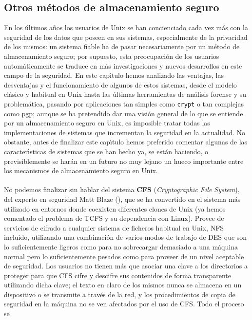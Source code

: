 \subsection{Otros m\'etodos de almacenamiento seguro}
En los \'ultimos a\~nos los usuarios de Unix se han concienciado cada vez m\'as
con la seguridad de los datos que poseen en sus sistemas, especialmente de la
privacidad de los mismos: un sistema fiable ha de pasar necesariamente por un 
m\'etodo de almacenamiento seguro; por supuesto, esta preocupaci\'on de los 
usuarios autom\'aticamente se traduce en m\'as investigaciones y nuevos 
desarrollos en este campo de la seguridad. En este cap\'{\i}tulo hemos analizado
las ventajas, las desventajas y el funcionamiento de algunos de estos sistemas,
desde el modelo cl\'asico y habitual en Unix hasta las \'ultimas herramientas
de an\'alisis forense y su problem\'atica, pasando por aplicaciones tan simples
como {\tt crypt} o tan complejas como {\sc pgp}; aunque se ha pretendido dar 
una visi\'on general de lo que se entiende por un almacenamiento seguro en 
Unix, es imposible tratar todas las implementaciones de sistemas que incrementan
la seguridad en la actualidad. No obstante, antes de finalizar este 
cap\'{\i}tulo hemos preferido comentar algunas de las caracter\'{\i}sticas de 
sistemas que se han hecho ya, se est\'an haciendo, o previsiblemente se har\'an
en un futuro no muy lejano un hueco importante entre los mecanismos de 
almacenamiento seguro en Unix.\\
\\No podemos finalizar sin hablar del sistema {\bf CFS} ({\it Cryptographic
File System}), del experto en seguridad Matt Blaze (\cite{kn:cfs93}), que se
ha convertido en el sistema m\'as utilizado en entornos donde coexisten 
diferentes clones de Unix (ya hemos comentado el problema de TCFS y su 
dependencia con Linux). Provee de servicios de cifrado a cualquier sistema de
ficheros habitual en Unix, NFS incluido, utilizando una combinaci\'on de varios 
modos de trabajo de DES que son lo suficientemente ligeros como para no 
sobrecargar demasiado a una m\'aquina normal pero lo suficientemente pesados 
como para proveer de un nivel aceptable de seguridad. Los usuarios no 
tienen m\'as que asociar una clave a los directorios a proteger para
que CFS cifre y descifre sus contenidos de forma transparente utilizando dicha
clave; el texto en claro de los mismos nunca se almacena en un dispositivo o
se transmite a trav\'es de la red, y los procedimientos de copia de seguridad
en la m\'aquina no se ven afectados por el uso de CFS. Todo el proceso se
